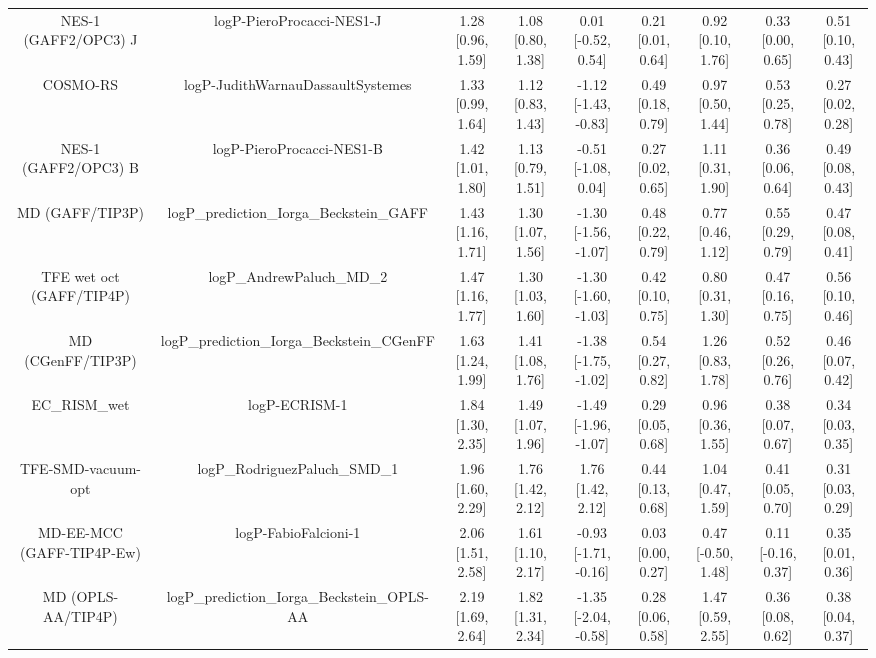 \documentclass{article}
\begin{document}
\begin{center}
\begin{longtable}{|ccccccccc|}
         NES-1 (GAFF2/OPC3) J &                      logP-PieroProcacci-NES1-J &  1.28 [0.96, 1.59] &  1.08 [0.80, 1.38] &    0.01 [-0.52, 0.54] &  0.21 [0.01, 0.64] &     0.92 [0.10, 1.76] &     0.33 [0.00, 0.65] &     0.51 [0.10, 0.43] \\
                     COSMO-RS &              logP-JudithWarnauDassaultSystemes &  1.33 [0.99, 1.64] &  1.12 [0.83, 1.43] &  -1.12 [-1.43, -0.83] &  0.49 [0.18, 0.79] &     0.97 [0.50, 1.44] &     0.53 [0.25, 0.78] &     0.27 [0.02, 0.28] \\
         NES-1 (GAFF2/OPC3) B &                      logP-PieroProcacci-NES1-B &  1.42 [1.01, 1.80] &  1.13 [0.79, 1.51] &   -0.51 [-1.08, 0.04] &  0.27 [0.02, 0.65] &     1.11 [0.31, 1.90] &     0.36 [0.06, 0.64] &     0.49 [0.08, 0.43] \\
              MD (GAFF/TIP3P) &       logP\_prediction\_Iorga\_Beckstein\_GAFF &  1.43 [1.16, 1.71] &  1.30 [1.07, 1.56] &  -1.30 [-1.56, -1.07] &  0.48 [0.22, 0.79] &     0.77 [0.46, 1.12] &     0.55 [0.29, 0.79] &     0.47 [0.08, 0.41] \\
     TFE wet oct (GAFF/TIP4P) &                      logP\_AndrewPaluch\_MD\_2 &  1.47 [1.16, 1.77] &  1.30 [1.03, 1.60] &  -1.30 [-1.60, -1.03] &  0.42 [0.10, 0.75] &     0.80 [0.31, 1.30] &     0.47 [0.16, 0.75] &     0.56 [0.10, 0.46] \\
            MD (CGenFF/TIP3P) &     logP\_prediction\_Iorga\_Beckstein\_CGenFF &  1.63 [1.24, 1.99] &  1.41 [1.08, 1.76] &  -1.38 [-1.75, -1.02] &  0.54 [0.27, 0.82] &     1.26 [0.83, 1.78] &     0.52 [0.26, 0.76] &     0.46 [0.07, 0.42] \\
                  EC_RISM_wet &                                  logP-ECRISM-1 &  1.84 [1.30, 2.35] &  1.49 [1.07, 1.96] &  -1.49 [-1.96, -1.07] &  0.29 [0.05, 0.68] &     0.96 [0.36, 1.55] &     0.38 [0.07, 0.67] &     0.34 [0.03, 0.35] \\
           TFE-SMD-vacuum-opt &                  logP\_RodriguezPaluch\_SMD\_1 &  1.96 [1.60, 2.29] &  1.76 [1.42, 2.12] &     1.76 [1.42, 2.12] &  0.44 [0.13, 0.68] &     1.04 [0.47, 1.59] &     0.41 [0.05, 0.70] &     0.31 [0.03, 0.29] \\
    MD-EE-MCC (GAFF-TIP4P-Ew) &                           logP-FabioFalcioni-1 &  2.06 [1.51, 2.58] &  1.61 [1.10, 2.17] &  -0.93 [-1.71, -0.16] &  0.03 [0.00, 0.27] &    0.47 [-0.50, 1.48] &    0.11 [-0.16, 0.37] &     0.35 [0.01, 0.36] \\
           MD (OPLS-AA/TIP4P) &    logP\_prediction\_Iorga\_Beckstein\_OPLS-AA &  2.19 [1.69, 2.64] &  1.82 [1.31, 2.34] &  -1.35 [-2.04, -0.58] &  0.28 [0.06, 0.58] &     1.47 [0.59, 2.55] &     0.36 [0.08, 0.62] &     0.38 [0.04, 0.37] \\

\end{longtable}
\end{center}
\end{document}

